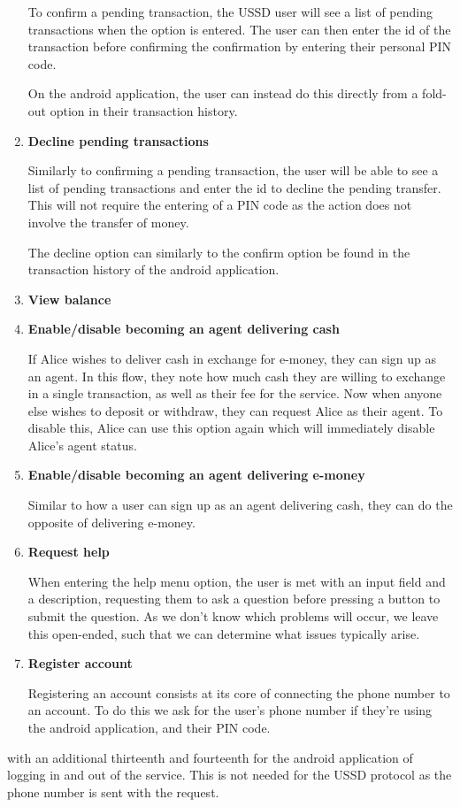 \documentclass[11pt, a4paper]{article}
\begin{document}
\begin{enumerate}
  To confirm a pending transaction, the USSD user will see a list of pending transactions when the option is entered. The user can then enter the id of the transaction before confirming the confirmation by entering their personal PIN code.

  On the android application, the user can instead do this directly from a fold-out option in their transaction history.
  \item \textbf{Decline pending transactions}

  Similarly to confirming a pending transaction, the user will be able to see a list of pending transactions and enter the id to decline the pending transfer. This will not require the entering of a PIN code as the action does not involve the transfer of money.

  The decline option can similarly to the confirm option be found in the transaction history of the android application.

  \item \textbf{View balance}

  \item \textbf{Enable/disable becoming an agent delivering cash}

  If Alice wishes to deliver cash in exchange for e-money, they can sign up as an agent. In this flow, they note how much cash they are willing to exchange in a single transaction, as well as their fee for the service. Now when anyone else wishes to deposit or withdraw, they can request Alice as their agent. To disable this, Alice can use this option again which will immediately disable Alice's agent status.
  \item \textbf{Enable/disable becoming an agent delivering e-money}

  Similar to how a user can sign up as an agent delivering cash, they can do the opposite of delivering e-money.
  \item \textbf{Request help}

  When entering the help menu option, the user is met with an input field and a description, requesting them to ask a question before pressing a button to submit the question. As we don't know which problems will occur, we leave this open-ended, such that we can determine what issues typically arise.
  \item \textbf{Register account}

  Registering an account consists at its core of connecting the phone number to an account. To do this we ask for the user's phone number if they're using the android application, and their PIN code.
\end{enumerate}
with an additional thirteenth and fourteenth for the android application of logging in and out of the service. This is not needed for the USSD protocol as the phone number is sent with the request.
\end{document}
